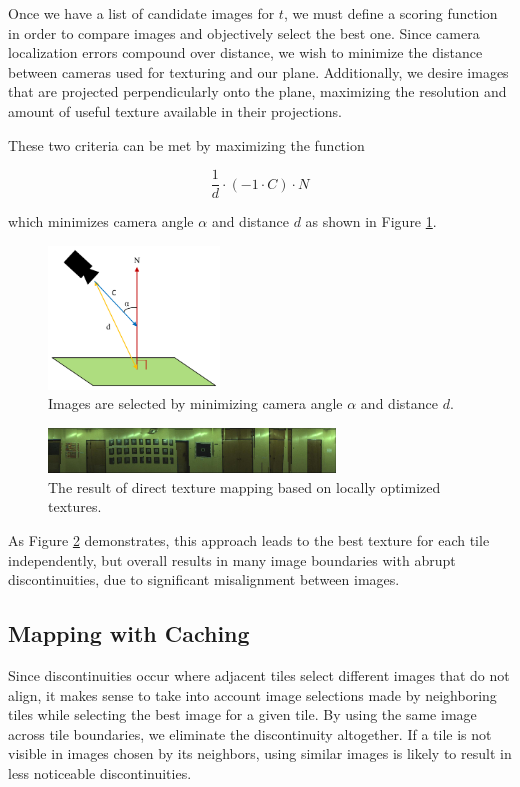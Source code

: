 \message{ !name(paper.tex)}\documentclass[10pt,twocolumn,letterpaper]{article}
\begin{document}
Once we have a list of candidate images for $t$, we must define a
scoring function in order to compare images and objectively select the
best one. Since camera localization errors compound over distance, we
wish to minimize the distance between cameras used for texturing and
our plane. Additionally, we desire images that are projected
perpendicularly onto the plane, maximizing the resolution and amount
of useful texture available in their projections.

These two criteria can be met by maximizing the function

\[
\frac{1}{d} \cdot (-1 \cdot C) \cdot N
\]

which minimizes camera angle $\alpha$ and distance $d$ as shown in Figure \ref{fig:scoringFunction}. 

\begin{figure}
  \centering
  \includegraphics[height=1.5in]{scoringFunction.pdf}
  \caption{Images are selected by minimizing camera angle $\alpha$ and distance $d$.}
  \label{fig:scoringFunction}
\end{figure}



\begin{figure}
  \centering
  \includegraphics[width=3in]{wall1_naive.jpg}
  \caption{The result of direct texture mapping based on locally
    optimized textures.}
  \label{fig:directMapping}
\end{figure}


As Figure \ref{fig:directMapping} demonstrates, this approach leads to
the best texture for each tile independently, but overall results in
many image boundaries with abrupt discontinuities, due to significant
misalignment between images.

\subsection{Mapping with Caching}
\label{sec:mappingWithCaching}
Since discontinuities occur where adjacent tiles select different
images that do not align, it makes sense to take into account image
selections made by neighboring tiles while selecting the best image
for a given tile. By using the same image across tile boundaries, we
eliminate the discontinuity altogether. If a tile is not visible in
images chosen by its neighbors, using similar images is likely to
result in less noticeable discontinuities.
\end{document}
